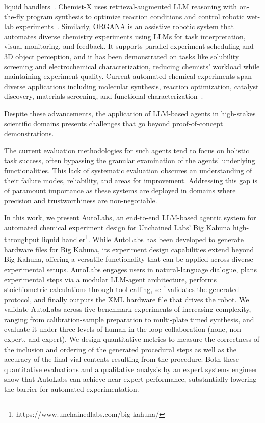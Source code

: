 \documentclass[sn-nature, twocolumn]{sn-jnl}%
\theoremstyle{thmstyleone}%
\theoremstyle{thmstyletwo}%
\theoremstyle{thmstylethree}%
\begin{document}
liquid handlers~\cite{boiko_autonomous_2023}. Chemist-X uses retrieval-augmented LLM reasoning with on-the-fly program synthesis to optimize reaction conditions and control robotic wet-lab experiments~\cite{chen2025chemistxlargelanguagemodelempowered}. Similarly, 
ORGANA is an assistive robotic system that automates diverse chemistry experiments using LLMs for task interpretation, visual monitoring, and feedback. It supports parallel experiment scheduling and 3D object perception, and it has been demonstrated on tasks like solubility screening and electrochemical characterization, reducing chemists' workload while maintaining experiment quality\cite{DARVISH2025101897}.
Current automated chemical experiments span diverse applications including molecular synthesis, reaction optimization, catalyst discovery, materials screening, and functional characterization~\cite{dai_autonomous_2024, volk_alphaflow_2023, doi:10.1126/science.adi1407}. 


Despite these advancements, the application of LLM-based agents in high-stakes scientific domains presents challenges that go beyond proof-of-concept demonstrations. 

The current evaluation methodologies for such agents tend to focus on holistic task success, often bypassing the granular examination of the agents’ underlying functionalities. This lack of systematic evaluation obscures an understanding of their failure modes, reliability, and areas for improvement. Addressing this gap is of paramount importance as these systems are deployed in domains where precision and trustworthiness are non-negotiable. 



In this work, we present AutoLabs, an end-to-end LLM-based agentic system for automated chemical experiment design for Unchained Labs’ Big Kahuna high-throughput liquid handler\footnote{https://www.unchainedlabs.com/big-kahuna/}. 
While AutoLabs has been developed to generate hardware files for Big Kahuna, its experiment design capabilities extend beyond Big Kahuna, offering a versatile functionality that can be applied across diverse experimental setups. AutoLabs engages users in natural-language dialogue, plans experimental steps via a modular LLM-agent architecture, performs stoichiometric calculations through tool-calling, self-validates the generated protocol, and finally outputs the XML hardware file that drives the robot. We validate AutoLabs across five benchmark experiments of increasing complexity, ranging from calibration-sample preparation to multi-plate timed synthesis, and evaluate it under three levels of human-in-the-loop collaboration (none, non-expert, and expert). We design quantitative metrics to measure the correctness of the inclusion and ordering of the generated procedural steps as well as the accuracy of the final vial contents resulting from the procedure. Both these quantitative evaluations and a qualitative analysis by an expert systems engineer show that AutoLabs can achieve near-expert performance, substantially lowering the barrier for automated experimentation.
\end{document}
